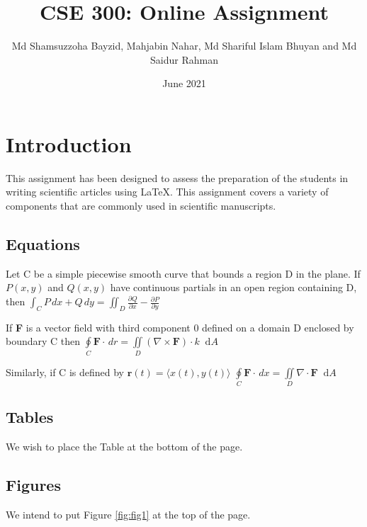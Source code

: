 \documentclass[14pt, a4paper]{article} %
\title{CSE 300: Online Assignment}
\author{Md Shamsuzzoha Bayzid, Mahjabin Nahar, Md Shariful Islam Bhuyan and Md Saidur Rahman}
\date{June 2021}
\newcommand*\VF[1]{\mathbf{#1}}
\newcommand*\dif{\mathop{}\!\mathrm{d}}
\begin{document}
    \maketitle
    \section{Introduction}
    This assignment has been designed to assess the preparation of the students in writing scientific articles using \LaTeX. This assignment covers a variety of components that are commonly used in scientific manuscripts.
    
    \subsection{Equations}
    Let C be a simple piecewise smooth curve that bounds a region D in the plane. If $P(x, y)$ and $Q(x, y)$ have continuous partials in an open region containing D, then\linebreak
    $\int_C P \,dx + Q \,dy = \iint_D \frac{\partial Q}{\partial x} - \frac{\partial P}{\partial y}$
    \par
    If \textbf{F} is a vector field with third component 0 defined on a domain D enclosed by boundary C then\linebreak
    $
    \oint\limits_C \VF{F}\cdot \,dr
  = \iint\limits_D (\nabla \times \VF{F})\cdot k \dif A
  $
  \par
  Similarly, if C is defined by $\VF{r}(t) = \langle x(t), y(t) \rangle$\linebreak
  $
    \oint\limits_C \VF{F}\cdot \,dx 
  = \iint\limits_D \nabla \cdot \VF{F}\dif A
  $
    \subsection{Tables}
    We wish to place the Table at the bottom of the page.
    
    \subsection{Figures}
    We intend to put Figure \ref{fig:fig1} at the top of the page.
    \pagebreak
\end{document}
